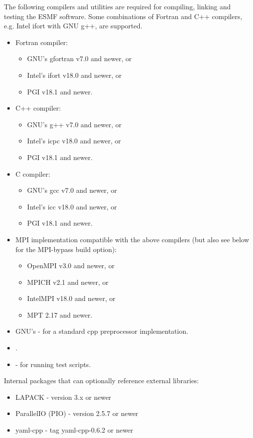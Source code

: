 

The following compilers and utilities are required for compiling, linking and
testing the ESMF software. Some combinations of Fortran and C++ compilers,
e.g. Intel ifort with GNU g++, are supported.
\begin{itemize}
\item Fortran compiler:
  \begin{itemize}
  \item GNU's gfortran v7.0 and newer, or
  \item Intel's ifort v18.0 and newer, or
  \item PGI v18.1 and newer.
  \end{itemize} 
\item C++ compiler:
  \begin{itemize}
  \item GNU's g++ v7.0 and newer, or
  \item Intel's icpc v18.0 and newer, or
  \item PGI v18.1 and newer.
  \end{itemize} 
\item C compiler:
  \begin{itemize}
  \item GNU's gcc v7.0 and newer, or
  \item Intel's icc v18.0 and newer, or
  \item PGI v18.1 and newer.
  \end{itemize} 
\item MPI implementation compatible with the above compilers (but also see below
for the MPI-bypass build option):
  \begin{itemize}
  \item OpenMPI v3.0 and newer, or
  \item MPICH v2.1 and newer, or
  \item IntelMPI v18.0 and newer, or
  \item MPT 2.17 and newer.
  \end{itemize} 
\item GNU's  -
for a standard cpp preprocessor implementation.
\item {}.
\item {} - for running
test scripts.
\end{itemize}

Internal packages that can optionally reference external libraries:
\begin{itemize}
\item LAPACK - version 3.x or newer
\item ParallelIO (PIO) - version 2.5.7 or newer
\item yaml-cpp - tag yaml-cpp-0.6.2 or newer
\end{itemize}

